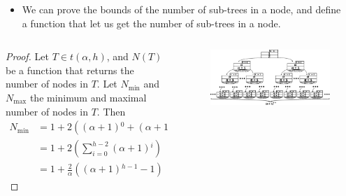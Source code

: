 \begin{frame}
    \begin{columns}
        \begin{column}{\textlecolumn}
            \begin{block}{}
                \vspace{-0.5cm}
                \begin{itemize}
                    \item We can prove the bounds of the number of sub-trees in a node, and define a function that let us get the number of sub-trees in a node.
                \end{itemize}
            \end{block}
        \end{column}
        \begin{column}{\textricolumn}
        \end{column}
    \end{columns}
    \begin{columns}
        \begin{column}{0.45\textwidth}
            \begin{block}{}
                \begin{proof}\renewcommand{\qedsymbol}{}
                    Let \(T \in t\left(\alpha, h\right)\), and \(N(T)\) be a function that returns the number of nodes in \(T\).
                    Let \(N_{\text{min}}\) and \(N_{\text{max}}\) the minimum and maximal number of nodes in \(T\). Then
                    \[
                        \begin{aligned}
                            N_{\text{min}} &= 1 + 2\left(\left(\alpha + 1\right){}^0 + \left(\alpha + 1\right){}^1 + \cdots + \left(\alpha + 1\right){}^{h-2} \right) \\
                            & = 1 + 2\left(\sum^{h - 2}_{i = 0} \left(\alpha + 1\right){}^i \right) \\
                            & = 1 + \frac{2}{\alpha}\left(\left(\alpha + 1\right){}^{h - 1} - 1\right)
                        \end{aligned}
                    \]
                \end{proof}
            \end{block}
        \end{column}
        \begin{column}{0.6\textwidth}
            \begin{figure}
                \includegraphics[width=\linewidth,keepaspectratio]{resources/made/generic_min_btree.eps}

\end{figure}
\end{column}
\end{columns}
\end{frame}
